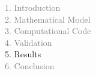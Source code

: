 \begin{frame}
  \vspace{-1cm}
  \textcolor{gray}{1. Introduction}\\[0.1cm]
  \textcolor{gray}{2. Mathematical Model}\\[0.1cm]
  \textcolor{gray}{3. Computational Code}\\[0.1cm]
  \textcolor{gray}{4. Validation}\\[0.1cm]
  5. Results\\[0.1cm]
  \textcolor{gray}{6. Conclusion}
\end{frame}

